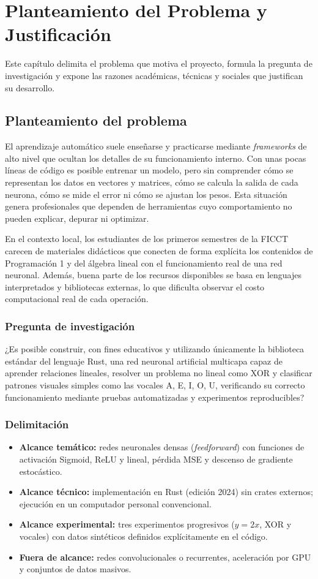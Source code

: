 \chapter{Planteamiento del Problema y Justificación}\label{cap:problema}
Este capítulo delimita el problema que motiva el proyecto, formula la pregunta de investigación y expone las razones académicas, técnicas y sociales que justifican su desarrollo.

\section{Planteamiento del problema}
El aprendizaje automático suele enseñarse y practicarse mediante \emph{frameworks} de alto nivel que ocultan los detalles de su funcionamiento interno. Con unas pocas líneas de código es posible entrenar un modelo, pero sin comprender cómo se representan los datos en vectores y matrices, cómo se calcula la salida de cada neurona, cómo se mide el error ni cómo se ajustan los pesos. Esta situación genera profesionales que dependen de herramientas cuyo comportamiento no pueden explicar, depurar ni optimizar.

En el contexto local, los estudiantes de los primeros semestres de la FICCT carecen de materiales didácticos que conecten de forma explícita los contenidos de Programación 1 y del álgebra lineal con el funcionamiento real de una red neuronal. Además, buena parte de los recursos disponibles se basa en lenguajes interpretados y bibliotecas externas, lo que dificulta observar el costo computacional real de cada operación.

\subsection{Pregunta de investigación}
¿Es posible construir, con fines educativos y utilizando únicamente la biblioteca estándar del lenguaje Rust, una red neuronal artificial multicapa capaz de aprender relaciones lineales, resolver un problema no lineal como XOR y clasificar patrones visuales simples como las vocales A, E, I, O, U, verificando su correcto funcionamiento mediante pruebas automatizadas y experimentos reproducibles?

\subsection{Delimitación}
\begin{itemize}
\item \textbf{Alcance temático:} redes neuronales densas (\emph{feedforward}) con funciones de activación Sigmoid, ReLU y lineal, pérdida MSE y descenso de gradiente estocástico.
\item \textbf{Alcance técnico:} implementación en Rust (edición 2024) sin crates externos; ejecución en un computador personal convencional.
\item \textbf{Alcance experimental:} tres experimentos progresivos ($y=2x$, XOR y vocales) con datos sintéticos definidos explícitamente en el código.
\item \textbf{Fuera de alcance:} redes convolucionales o recurrentes, aceleración por GPU y conjuntos de datos masivos.
\end{itemize}

